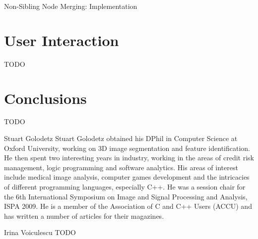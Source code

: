 \documentclass[10pt,twocolumn,twoside]{IEEEtran}
\begin{document}
\begin{stulisting}[p]
\caption{Non-Sibling Node Merging: Implementation}
\label{code:ipfs-forest-mergenonsiblingnodes}

\end{stulisting}

\section{User Interaction}
\label{sec:ui}

TODO

\section{Conclusions}
\label{sec:conclusions}

TODO

\clearpage




\begin{IEEEbiography}{Stuart Golodetz}
Stuart Golodetz obtained his DPhil in Computer Science at Oxford University, working on 3D image segmentation and feature identification. He then spent two interesting years in industry, working in the areas of credit risk management, logic programming and software analytics. His areas of interest include medical image analysis, computer games development and the intricacies of different programming languages, especially C++. He was a session chair for the 6th International Symposium on Image and Signal Processing and Analysis, ISPA 2009. He is a member of the Association of C and C++ Users (ACCU) and has written a number of articles for their magazines.
\end{IEEEbiography}

\begin{IEEEbiography}{Irina Voiculescu}
TODO
\end{IEEEbiography}
\end{document}
